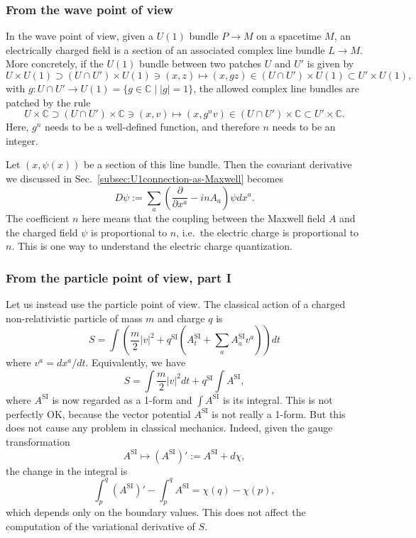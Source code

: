 \documentclass[12pt]{article}
\numberwithin{equation}{section}
\theoremstyle{remark}
\def\bC{\mathbb{C}}
\begin{document}
\subsubsection{From the wave point of view}
In the wave point of view, given a $U(1)$ bundle $P\to M$ on a spacetime $M$,
an electrically charged field is a section of an associated complex line bundle $L\to M$.
More concretely, if  the $U(1)$ bundle between two patches $U$ and $U'$ is given by \begin{equation}
U\times U(1) \supset (U\cap U')\times U(1) \ni (x,z) 
\mapsto (x,gz) \in (U\cap U')\times U(1)\subset U'\times U(1),
\end{equation} with $g:U\cap U' \to U(1)=\{g\in \bC \mid |g|=1\}$,
the allowed complex line bundles are patched by the rule \begin{equation}
U\times \bC \supset (U\cap U')\times \bC \ni (x,v) 
\mapsto (x,g^n v) \in (U\cap U')\times \bC\subset U'\times \bC.
\end{equation}
Here, $g^n$ needs to be a well-defined function, and therefore $n$ needs to be an integer. 

Let $(x,\psi(x))$ be a section of this line bundle. Then the covariant derivative we discussed in Sec.~\ref{subsec:U1connection-as-Maxwell} becomes \begin{equation}
D\psi := \sum_a\left(\frac{\partial}{\partial x^a} - i n A_a\right)\psi dx^a.
\end{equation}
The coefficient $n$ here means that the coupling between the Maxwell field $A$ and the charged field $\psi$ is proportional to $n$, 
i.e.~the electric charge is proportional to $n$. 
This is one way to understand the electric charge quantization.

\subsubsection{From the particle point of view, part I}
Let us instead use the particle point of view.
The classical action of a charged non-relativistic particle of mass $m$ and charge $q$ is \begin{equation}
S = \int \left(\frac m2 |v|^2 + q^\text{SI} (A^\text{SI}_t + \sum_a A^\text{SI}_a v^a) \right)dt 
\end{equation} where $v^a= dx^a/dt$.
Equivalently, we have \begin{equation}
S = \int \frac m2 |v|^2 dt + q^\text{SI} \int  A^\text{SI},
\end{equation} where $A^\text{SI}$ is now regarded as a 1-form and $\int A^\text{SI}$ is its integral.
This is not perfectly OK, because the vector potential $A^\text{SI}$ is not really a 1-form.
But this does not cause any problem in classical mechanics.
Indeed, given the gauge transformation \begin{equation}
A^\text{SI} \mapsto (A^\text{SI})':=A^\text{SI} + d\chi,
\end{equation} the change in the  integral is  \begin{equation}
\int_p^q (A^\text{SI})'-\int_p^q A^\text{SI} =  \chi(q)-\chi(p),
\end{equation} which depends only on the boundary values.
This does not affect the computation of the variational derivative of $S$.
\end{document}
